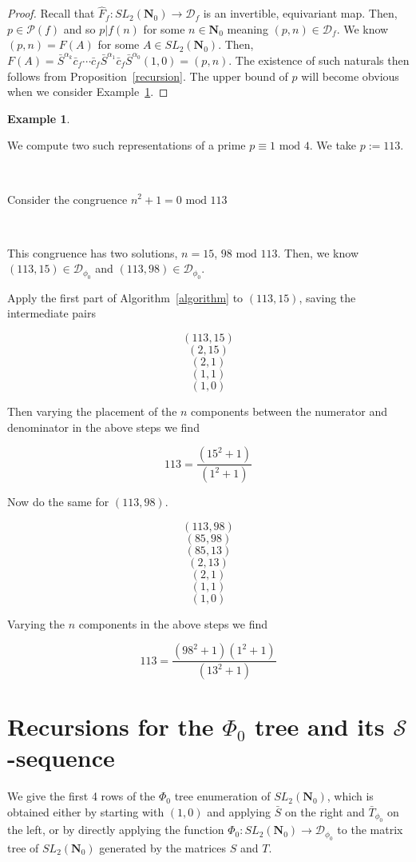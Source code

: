 \documentclass{article}
\newtheorem{example}[theorem]{Example}  %
\begin{document}
\begin{proof}
Recall that $\hat{F}_f: SL_2(\mathbf{N}_0) \rightarrow \mathcal{D}_f$ is an invertible, equivariant map. Then, $p \in \mathcal{P}(f)$ and so $p \lvert f(n)$ for some $n \in \mathbf{N}_0$ meaning $(p, n) \in \mathcal{D}_f$. We know $(p, n) = F(A)$ for some $A \in SL_2(\mathbf{N}_0)$. Then, $F(A) = \bar{S}^{\alpha_k} \bar{c}_f \cdots \bar{c}_f \bar{S}^{\alpha_1}\bar{c}_f\bar{S}^{\alpha_0}(1,0) = (p, n)$. The existence of such naturals then follows from Proposition~\ref{recursion}. The upper bound of $p$ will become obvious when we consider Example~\ref{fraction}.
\end{proof}


\begin{example}\label{fraction}
\end{example}

We compute two such representations of a prime $p \equiv 1 \text{ mod } 4$. We take $p := 113$.

\

Consider the congruence $n^2 + 1 = 0 \text{ mod } 113$

\

This congruence has two solutions, $n = 15$, $98 \text { mod } 113$. Then, we know $(113,15) \in \mathcal{D}_{\phi_0}$ and $(113, 98) \in \mathcal{D}_{\phi_0}$.

Apply the first part of Algorithm~\ref{algorithm} to $(113, 15)$, saving the intermediate pairs

$$(113, 15)$$
$$(2, 15)$$
$$(2, 1)$$
$$(1,1)$$
$$(1,0)$$

Then varying the placement of the $n$ components between the numerator and denominator in the above steps we find

$$113 = \frac{(15^2 + 1)}{(1^2 + 1)}$$

Now do the same for $(113, 98)$.

$$(113, 98)$$
$$(85, 98)$$
$$(85, 13)$$
$$(2, 13)$$
$$(2, 1)$$
$$(1,1)$$
$$(1,0)$$

Varying the $n$ components in the above steps we find

$$113 = \frac{(98^2 + 1)(1^2 + 1)}{(13^2 + 1)}$$

\section{Recursions for the $\Phi_0$ tree and its $\mathcal{S}$-sequence}\label{section_phi0recursions}

We give the first 4 rows of the $\Phi_0$ tree enumeration of $SL_2(\mathbf{N}_0)$, which is obtained either by starting with $(1, 0)$ and applying $\bar{S}$ on the right and $\bar{T}_{\phi_0}$ on the left, or by directly applying the function $\Phi_0: SL_2(\mathbf{N}_0) \rightarrow \mathcal{D}_{\phi_0}$ to the matrix tree of $SL_2(\mathbf{N}_0)$ generated by the matrices $S$ and $T$.
\end{document}
